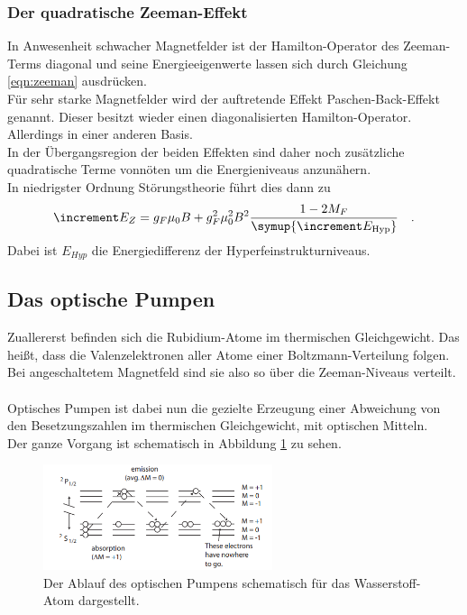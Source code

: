 \subsubsection{Der quadratische Zeeman-Effekt}

\noindent
In Anwesenheit schwacher Magnetfelder ist der Hamilton-Operator des Zeeman-Terms diagonal und seine Energieeigenwerte lassen sich durch Gleichung \ref{eqn:zeeman} ausdrücken.\\
Für sehr starke Magnetfelder wird der auftretende Effekt Paschen-Back-Effekt genannt. Dieser besitzt wieder einen diagonalisierten Hamilton-Operator. Allerdings in einer anderen Basis.\\
In der Übergangsregion der beiden Effekten sind daher noch zusätzliche quadratische Terme vonnöten um die Energieniveaus anzunähern.\\ 
In niedrigster Ordnung Störungstheorie führt dies dann zu
\begin{equation*}
 \increment E_{Z} = g_F \mu_\text{0}B+g^2_F\mu^2_\text{0}B^2\frac{1-2M_F}{\symup{\increment E_\text{Hyp}}} \quad . 
 \label{eqn:zee_quad}
\end{equation*} 
Dabei ist $E_{Hyp}$ die Energiedifferenz der Hyperfeinstrukturniveaus.

\subsection{Das optische Pumpen}

\noindent
Zuallererst befinden sich die Rubidium-Atome im thermischen Gleichgewicht. 
Das heißt, dass die Valenzelektronen aller Atome einer Boltzmann-Verteilung folgen. 
Bei angeschaltetem Magnetfeld sind sie also so über die Zeeman-Niveaus verteilt.\\\\
Optisches Pumpen ist dabei nun die gezielte Erzeugung einer Abweichung von den Besetzungszahlen im thermischen Gleichgewicht, mit optischen Mitteln.\\
Der ganze Vorgang ist schematisch in Abbildung \ref{img:pumpitup} zu sehen.

\begin{figure}[H]
    \centering
    \includegraphics[width=0.6\textwidth]{latex/images/pumping.PNG}
    \caption{Der Ablauf des optischen Pumpens schematisch für das Wasserstoff-Atom dargestellt\protect \cite{pump_1}.}
    \label{img:pumpitup}
\end{figure}

